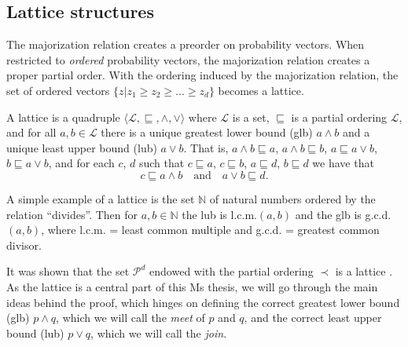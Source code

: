 \subsection{Lattice structures}

The majorization relation creates a preorder on probability vectors. When restricted to \textit{ordered} probability vectors, the majorization relation creates a proper partial order. With the ordering induced by the majorization relation, the set of ordered vectors $\{z | z_1 \geq z_2 \geq ... \geq z_d\}$ becomes a lattice.

\begin{definition}[Lattice] \label{def:lattice} %
    A lattice is a quadruple $\langle \mathcal{L}, \sqsubseteq, \wedge, \vee \rangle$ where $\mathcal{L}$ is a set, $\sqsubseteq$ is a partial ordering $\mathcal{L}$, and for all $a, b \in \mathcal{L}$ there is a unique greatest lower bound (glb) $a \wedge b$ and a unique least upper bound (lub) $a \vee b$. That is, $a \wedge b \sqsubseteq a$, $a \wedge b \sqsubseteq b$, $a \sqsubseteq a \vee b$, $b \sqsubseteq a \vee b$, and for each $c$, $d$ such that $c \sqsubseteq a$, $c \sqsubseteq b$, $a \sqsubseteq d$, $b \sqsubseteq d$ we have that
    \begin{equation}
        c \sqsubseteq a \wedge b \quad \text{and} \quad a \vee b \sqsubseteq d.
    \end{equation}
\end{definition}

A simple example of a lattice is the set $\mathbb{N}$ of natural numbers ordered by the relation “divides”. Then for $a, b \in \mathbb{N}$ the lub is l.c.m.$(a, b)$ and the glb is g.c.d.$(a, b)$, where l.c.m. = least common multiple and g.c.d. = greatest common divisor. %

It was shown that the set $\mathcal{P}^d$ endowed with the partial ordering $\prec$ is a lattice \cite{cicalese_supermodularity_2002}. As the lattice is a central part of this Ms thesis, we will go through the main ideas behind the proof, which hinges on defining the correct greatest lower bound (glb) $p \wedge q$, which we will call the \textit{meet} of $p$ and $q$, and the correct least upper bound (lub) $p \vee q$, which we will call the \textit{join}.

